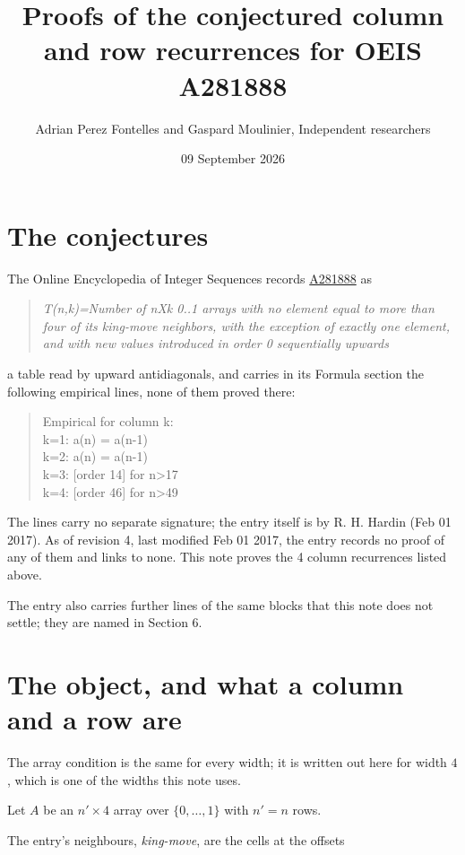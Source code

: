 \documentclass[11pt]{article}
\title{Proofs of the conjectured column and row recurrences for OEIS A281888}
\author{Adrian Perez Fontelles and Gaspard Moulinier, Independent researchers}
\date{09 September 2026}
\theoremstyle{definition}
\begin{document}
\maketitle
\section{The conjectures}

The Online Encyclopedia of Integer Sequences records \href{https://oeis.org/A281888}{A281888} as

\begin{quote}\itshape T(n,k)=Number of nXk 0..1 arrays with no element equal to more than four of its king-move neighbors, with the exception of exactly one element, and with new values introduced in order 0 sequentially upwards\end{quote}

a table read by upward antidiagonals, and carries in its Formula section the following empirical lines, none of them proved there:

\begin{quote}\ttfamily Empirical for column k:\\
k=1: a(n) = a(n-1)\\k=2: a(n) = a(n-1)\\k=3: [order 14] for n>17\\k=4: [order 46] for n>49\end{quote}

The lines carry no separate signature; the entry itself is by R. H. Hardin (Feb 01 2017). As of revision 4, last modified Feb 01 2017, the entry records no proof of any of them and links to none. This note proves the 4 column recurrences listed above.

The entry also carries further lines of the same blocks that this note does not settle; they are named in Section 6.

\section{The object, and what a column and a row are}

The array condition is the same for every width; it is written out here for width $4$, which is one of the widths this note uses.

Let $A$ be an $n' \times 4$ array over $\{0,\dots,1\}$ with $n' = n$ rows.

The entry's neighbours, {\itshape king-move}, are the cells at the offsets
\end{document}
